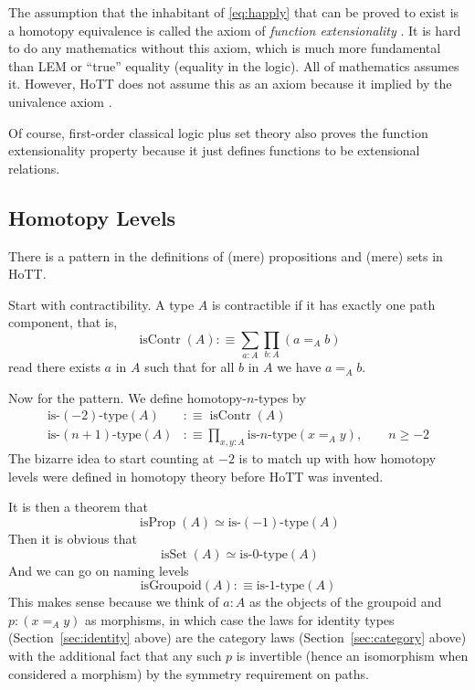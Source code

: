 \documentclass[11pt]{article}
\DeclareMathOperator{\isContr}{isContr}
\DeclareMathOperator{\isProp}{isProp}
\DeclareMathOperator{\isSet}{isSet}
\begin{document}
The assumption that the inhabitant of \eqref{eq:happly} that can be proved
to exist is a homotopy equivalence
is called the axiom of \emph{function extensionality}
.
It is hard to do any mathematics without this axiom, which is much more
fundamental than LEM or ``true'' equality (equality in the logic).
All of mathematics assumes it.
However, HoTT does not assume this as an axiom because it implied
by the univalence axiom .

Of course, first-order classical logic plus set theory also
proves the function extensionality property because it just defines
functions to be extensional relations.

\subsection{Homotopy Levels}
\label{sec:homotopy-levels}

There is a pattern in the definitions of (mere) propositions
and (mere) sets in HoTT.

Start with contractibility.  A type $A$ is contractible
if it has exactly one path component, that is,
\begin{equation} \label{eq:contractible}
   \isContr(A) :\equiv \sum_{a : A} \prod_{b : A} (a =_A b)
\end{equation}
read there exists $a$ in $A$ such that for all $b$ in $A$ we have $a =_A b$.

Now for the pattern.  We define homotopy-$n$-types
by
\begin{align}
   \text{is-$(- 2)$-type}(A) & :\equiv \isContr(A)
   \\
   \text{is-$(n + 1)$-type}(A)
   & :\equiv
   \prod_{x, y : A} \text{is-$n$-type}(x =_A y),
   \qquad n \ge -2
   \label{eq:type-recursion}
\end{align}
The bizarre idea to start counting at $- 2$ is to match up with how
homotopy levels were defined in homotopy theory before HoTT was invented.

It is then a theorem  that
$$
   \isProp(A) \simeq \text{is-$(-1)$-type}(A)
$$
Then it is obvious that
$$
   \isSet(A) \simeq \text{is-$0$-type}(A)
$$
And we can go on naming levels
$$
   \text{isGroupoid}(A) :\equiv \text{is-$1$-type}(A)
$$
This makes sense because we think of $a : A$ as the objects of the groupoid
and $p : (x =_A y)$ as morphisms, in which case the laws for identity types
(Section~\ref{sec:identity} above) are the category laws
(Section~\ref{sec:category} above) with the additional fact that any such $p$
is invertible (hence an isomorphism when considered a morphism) by the symmetry
requirement on paths.
\end{document}

